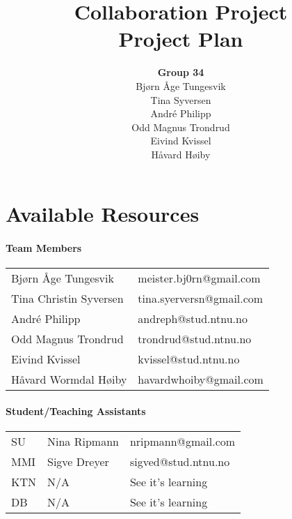 \documentclass{article}
\begin{document}

\begin{titlepage}
\title{Collaboration Project\\
Project Plan}
\author{\textbf{Group 34}\\
Bj\o rn \AA ge Tungesvik\\
Tina Syversen\\
Andr\'e Philipp\\
Odd Magnus Trondrud
\\Eivind Kvissel\\
H\aa vard H\o iby}
\maketitle
\end{titlepage}

\newpage

\part{Available Resources}

\subsection{Team Members}

\begin{tabular}{ll}
Bj\o rn \AA ge Tungesvik & meister.bj0rn@gmail.com \\ 
Tina Christin Syversen & tina.syerversn@gmail.com \\ 
Andr\'{e} Philipp & andreph@stud.ntnu.no \\ 
Odd Magnus Trondrud & trondrud@stud.ntnu.no \\ 
Eivind Kvissel & kvissel@stud.ntnu.no \\ 
H\aa vard Wormdal H\o iby & havardwhoiby@gmail.com%
\end{tabular}

\subsection{Student/Teaching Assistants}

\begin{tabular}{lll}
SU & Nina Ripmann & nripmann@gmail.com \\ 
MMI & Sigve Dreyer & sigved@stud.ntnu.no \\ 
KTN & N/A & See it's learning \\ 
DB & N/A & See it's learning%
\end{tabular}
\end{document}
